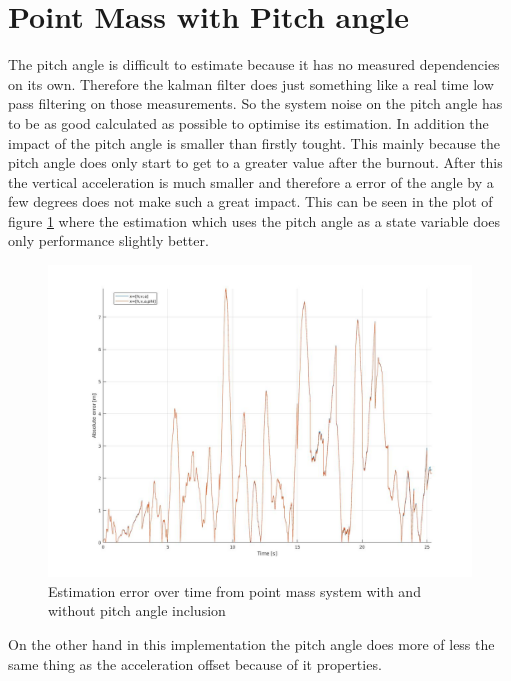 \section{Point Mass with Pitch angle}
The pitch angle is difficult to estimate because it has no measured dependencies on its own.
Therefore the kalman filter does just something like a real time low pass filtering on those measurements.
So the system noise on the pitch angle has to be as good calculated as possible to optimise its estimation.
In addition the impact of the pitch angle is smaller than firstly tought.
This mainly because the pitch angle does only start to get to a greater value after the burnout.
After this the vertical acceleration is much smaller and therefore a error of the angle by a few degrees does not make such a great impact.
This can be seen in the plot of figure \ref{fig:PointMassVSPitch} where the estimation which uses the pitch angle as a state variable does only performance slightly better.
\begin{figure}[h!]
 \centering
 \includegraphics[width=.8 \textwidth]{./Pictures/PointMassVSPitch.jpg}
 \caption{Estimation error over time from point mass system with and without pitch angle inclusion}
 \label{fig:PointMassVSPitch}
\end{figure}

On the other hand in this implementation the pitch angle does more of less the same thing as the acceleration offset because of it properties.


